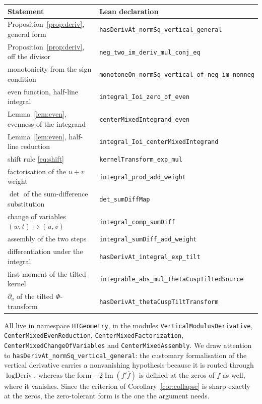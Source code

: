 \documentclass[11pt,a4paper]{amsart}
\theoremstyle{plain}
\theoremstyle{definition}
\newcommand{\Lean}[1]{\texttt{\small #1}}
\begin{document}
\begin{center}
\begin{tabular}{@{}ll@{}}
\toprule
Statement & Lean declaration \\
\midrule
Proposition~\ref{prop:deriv}, general form & \Lean{hasDerivAt\_normSq\_vertical\_general} \\
Proposition~\ref{prop:deriv}, off the divisor & \Lean{neg\_two\_im\_deriv\_mul\_conj\_eq} \\
monotonicity from the sign condition & \Lean{monotoneOn\_normSq\_vertical\_of\_neg\_im\_nonneg} \\
even function, half-line integral & \Lean{integral\_Ioi\_zero\_of\_even} \\
Lemma~\ref{lem:even}, evenness of the integrand & \Lean{centerMixedIntegrand\_even} \\
Lemma~\ref{lem:even}, half-line reduction & \Lean{integral\_Ioi\_centerMixedIntegrand} \\
shift rule \eqref{eq:shift} & \Lean{kernelTransform\_exp\_mul} \\
factorisation of the $u+v$ weight & \Lean{integral\_prod\_add\_weight} \\
$\det$ of the sum-difference substitution & \Lean{det\_sumDiffMap} \\
change of variables $(w,t)\mapsto(u,v)$ & \Lean{integral\_comp\_sumDiff} \\
assembly of the two steps & \Lean{integral\_sumDiff\_add\_weight} \\
differentiation under the integral & \Lean{hasDerivAt\_integral\_exp\_tilt} \\
first moment of the tilted kernel & \Lean{integrable\_abs\_mul\_thetaCuspTiltedSource} \\
$\partial_a$ of the tilted $\Phi$-transform & \Lean{hasDerivAt\_thetaCuspTiltTransform} \\
\bottomrule
\end{tabular}
\end{center}

All live in namespace \Lean{HTGeometry}, in the modules \Lean{VerticalModulusDerivative},
\Lean{CenterMixedEvenReduction}, \Lean{CenterMixedFactorization},
\Lean{CenterMixedChangeOfVariables} and \Lean{CenterMixedAssembly}. We draw attention to
\Lean{hasDerivAt\_normSq\_vertical\_general}: the customary formalisation of the vertical derivative
carries a nonvanishing hypothesis because it is routed through $\operatorname{logDeriv}$, whereas
the form $-2\operatorname{Im}(f'\overline f)$ is defined at the zeros of $f$ as well, where it
vanishes. Since the criterion of Corollary~\ref{cor:collapse} is sharp exactly at the zeros, the
zero-tolerant form is the one the argument needs.
\end{document}
